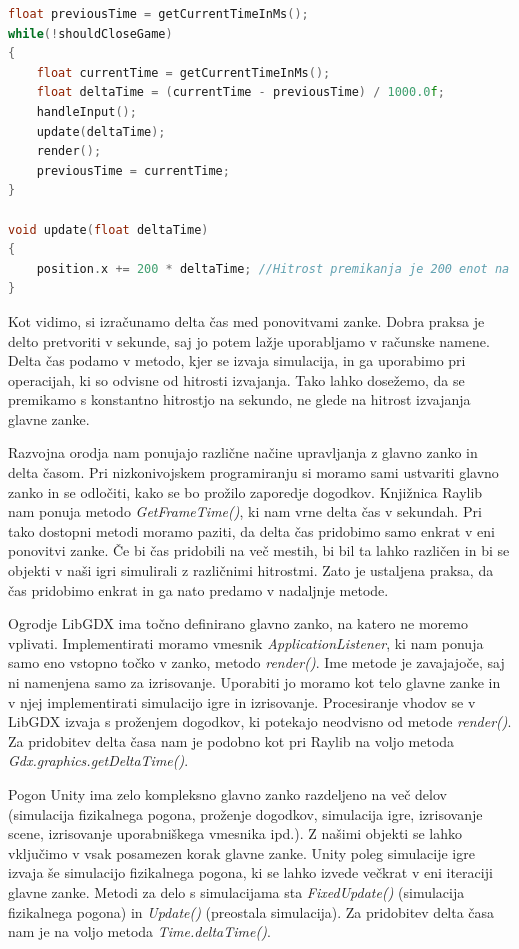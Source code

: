\documentclass[12pt,a4paper,twoside]{book}
\begin{document}
\begin{lstlisting}[label=code:deltaTime, language=C++, caption=Neodvisno gibanje]
float previousTime = getCurrentTimeInMs();
while(!shouldCloseGame)
{
	float currentTime = getCurrentTimeInMs();
	float deltaTime = (currentTime - previousTime) / 1000.0f;
	handleInput();
	update(deltaTime);
	render();
	previousTime = currentTime;
}

void update(float deltaTime)
{
	position.x += 200 * deltaTime; //Hitrost premikanja je 200 enot na sekundo
}
\end{lstlisting}
Kot vidimo, si izračunamo delta čas med ponovitvami zanke. Dobra praksa je delto pretvoriti v sekunde, saj jo potem lažje uporabljamo v računske namene. Delta čas podamo v metodo, kjer se izvaja simulacija, in ga uporabimo pri operacijah, ki so odvisne od hitrosti izvajanja. Tako lahko dosežemo, da se premikamo s konstantno hitrostjo na sekundo, ne glede na hitrost izvajanja glavne zanke.

Razvojna orodja nam ponujajo različne načine upravljanja z glavno zanko in delta časom. Pri nizkonivojskem programiranju si moramo sami ustvariti glavno zanko in se odločiti, kako se bo prožilo zaporedje dogodkov. Knjižnica Raylib nam ponuja metodo \textit{GetFrameTime()}, ki nam vrne delta čas v sekundah. Pri tako dostopni metodi moramo paziti, da delta čas pridobimo samo enkrat v eni ponovitvi zanke. Če bi čas pridobili na več mestih, bi bil ta lahko različen in bi se objekti v naši igri simulirali z različnimi hitrostmi. Zato je ustaljena praksa, da čas pridobimo enkrat in ga nato predamo v nadaljnje metode.

Ogrodje LibGDX ima točno definirano glavno zanko, na katero ne moremo vplivati. Implementirati moramo vmesnik \textit{ApplicationListener}, ki nam ponuja samo eno vstopno točko v zanko, metodo \textit{render()}. Ime metode je zavajajoče, saj ni namenjena samo za izrisovanje. Uporabiti jo moramo kot telo glavne zanke in v njej implementirati simulacijo igre in izrisovanje. Procesiranje vhodov se v LibGDX izvaja s proženjem dogodkov, ki potekajo neodvisno od metode \textit{render()}. Za pridobitev delta časa nam je podobno kot pri Raylib na voljo metoda \textit{Gdx.graphics.getDeltaTime()}.

Pogon Unity ima zelo kompleksno glavno zanko razdeljeno na več delov (simulacija fizikalnega pogona, proženje dogodkov, simulacija igre, izrisovanje scene, izrisovanje uporabniškega vmesnika ipd.). Z našimi objekti se lahko vključimo v vsak posamezen korak glavne zanke. Unity poleg simulacije igre izvaja še simulacijo fizikalnega pogona, ki se lahko izvede večkrat v eni iteraciji glavne zanke. Metodi za delo s simulacijama sta \textit{FixedUpdate()} (simulacija fizikalnega pogona) in \textit{Update()} (preostala simulacija). Za pridobitev delta časa nam je na voljo metoda \textit{Time.deltaTime()}.
\end{document}
